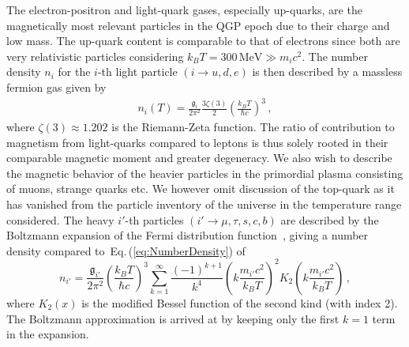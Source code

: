 \documentclass[epjST]{svjour}
\newcommand{\req}[1]{Eq.\,(\ref{#1})}
\begin{document}
The electron-positron and light-quark gases, especially up-quarks, are the magnetically most relevant particles in the QGP epoch due to their charge and low mass. The up-quark content is comparable to that of electrons since both are very relativistic particles considering \(k_{B}T=300\,\mathrm{MeV}\gg m_i c^{2}\). {\color{blue}The number density \(n_{i}\) for the \(i\)-th light particle \((i\rightarrow u,d,e)\) is then described by a massless fermion gas given by~\cite{Letessier:2002ony}
\begin{align}
\label{eq:NumberDensity}
n_{i}(T) = \frac{\mathfrak{g}_{i}}{2\pi^{2}}\frac{3\zeta(3)}{2}\left(\frac{k_{B}T}{\hbar c}\right)^{3}\,,
\end{align}
}where \(\zeta(3)\approx1.202\) is the Riemann-Zeta function. The ratio of contribution to magnetism from light-quarks compared to leptons is thus solely rooted in their comparable magnetic moment and greater degeneracy. {\color{blue} We also wish to describe the magnetic behavior of the heavier particles in the primordial plasma consisting of muons, strange quarks etc. We however omit discussion of the top-quark as it has vanished from the particle inventory of the universe in the temperature range considered. The heavy \(i'\)-th particles \((i'\rightarrow \mu,\tau,s,c,b)\) are described by the Boltzmann expansion of the Fermi distribution function~\cite{Yang:2024ret}, giving a number density compared to~\req{eq:NumberDensity} of
\begin{equation}
 \label{eq:HeavyNumberDensity}
 n_{i'} = \frac{\mathfrak{g}_{i'}}{2\pi^{2}}\left(\frac{k_{B}T}{\hbar c}\right)^{3}\sum_{k=1}^{\infty}\frac{(-1)^{k+1}}{k^4}\left(k\frac{m_{i'}c^{2}}{k_{B}T}\right)^{2}K_{2}\left(k\frac{m_{i'}c^{2}}{k_{B}T}\right)\,,
\end{equation}
where \(K_{2}(x)\) is the modified Bessel function of the second kind (with index 2). The Boltzmann approximation is arrived at by keeping only the first \(k=1\) term in the expansion.}
\end{document}
